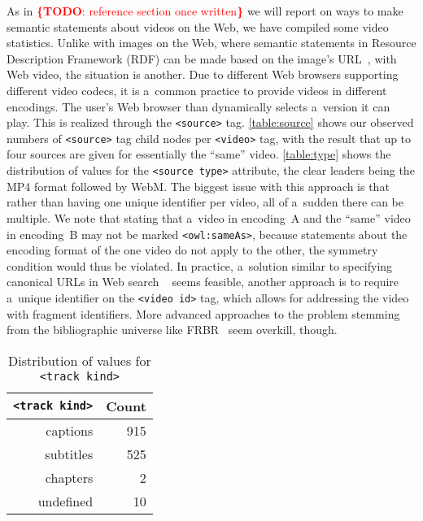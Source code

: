 \documentclass{sig-alternate}
\newcommand{\todo}[1]{\noindent\textcolor{red}{{\bf \{TODO}: #1{\bf \}}}}
\begin{document}
As in \todo{reference section once written}
we will report on ways to make semantic statements
about videos on the Web,
we have compiled some video statistics.
Unlike with images on the Web, where
semantic statements in
Resource Description Framework (RDF)
can be made based on the image's
URL~\cite{linsley2009rdfa},
with Web video, the situation is another.
Due to different Web browsers supporting
different video codecs,
it is a~common practice to provide videos
in different encodings.
The user's Web browser than dynamically selects
a~version it can play.
This is realized through the \texttt{<source>} tag.
\autoref{table:source} shows our observed numbers of
\texttt{<source>} tag child nodes per
\texttt{<video>} tag, with the result that up to
four sources are given for essentially the ``same'' video.
\autoref{table:type} shows the distribution
of values for the \texttt{<source type>} attribute,
the clear leaders being the MP4 format
followed by WebM.
The biggest issue with this approach is that
rather than having one unique identifier per video,
all of a~sudden there can be multiple.
We note that stating that a~video in encoding~A
and the ``same'' video in encoding~B
may not be marked \texttt{<owl:sameAs>},
because statements about the encoding format
of the one video do not apply to the other,
the symmetry condition would thus be violated.
In practice, a~solution similar to
specifying canonical URLs in Web search%
~\cite{kupke2009canonical} seems feasible,
another approach is to require a~unique identifier
on the \texttt{<video id>} tag,
which allows for addressing the video
with fragment identifiers.
More advanced approaches to the problem
stemming from the bibliographic universe
like FRBR~\cite{tillett2004frbr} seem overkill, though.


\begin{table}[p]
  \centering
  \begin{tabular}{ r | r }                       
    \texttt{<track kind>} & Count \\
    \hline  
    captions & 915\\
    subtitles & 525\\
    chapters & 2\\
    undefined & 10\\  
  \end{tabular}
  \caption{Distribution of values for
    \texttt{<track kind>}}
  \label{table:kind}
\end{table}
\end{document}
